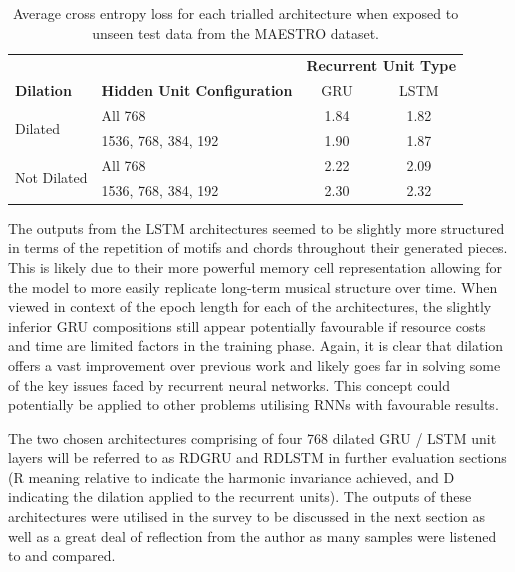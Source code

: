 \documentclass[12pt,]{article}
\begin{document}
\begin{table}[H]
\centering
\caption{Average cross entropy loss for each trialled architecture when exposed to unseen test data from the MAESTRO dataset.}
\vspace{1em}
\begin{tabular}{llcc} 
\toprule
                             &                                    & \multicolumn{2}{c}{\textbf{Recurrent Unit Type}}  \\
\textbf{Dilation}            & \textbf{Hidden Unit Configuration} & GRU   & LSTM                                      \\ 
\hline
\multirow{2}{*}{Dilated}     & All 768                            & 1.84  & 1.82                                      \\ 
                             & 1536, 768, 384, 192                & 1.90  & 1.87                                     \\ 
\multirow{2}{*}{Not Dilated} & All 768                            & 2.22  & 2.09                                     \\ 
                             & 1536, 768, 384, 192                & 2.30  & 2.32                                     \\
\bottomrule
\end{tabular}
\end{table}

The outputs from the LSTM architectures seemed to be slightly more
structured in terms of the repetition of motifs and chords throughout
their generated pieces. This is likely due to their more powerful memory
cell representation allowing for the model to more easily replicate
long-term musical structure over time. When viewed in context of the
epoch length for each of the architectures, the slightly inferior GRU
compositions still appear potentially favourable if resource costs and
time are limited factors in the training phase. Again, it is clear that
dilation offers a vast improvement over previous work and likely goes
far in solving some of the key issues faced by recurrent neural
networks. This concept could potentially be applied to other problems
utilising RNNs with favourable results.

The two chosen architectures comprising of four 768 dilated GRU / LSTM
unit layers will be referred to as RDGRU and RDLSTM in further
evaluation sections (R meaning relative to indicate the harmonic
invariance achieved, and D indicating the dilation applied to the
recurrent units). The outputs of these architectures were utilised in
the survey to be discussed in the next section as well as a great deal
of reflection from the author as many samples were listened to and
compared.
\end{document}
